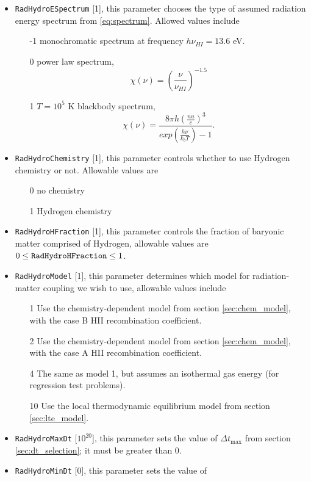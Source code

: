 \documentclass[letterpaper,10pt]{article}
\renewcommand{\(}{\left(}
\renewcommand{\)}{\right)}
\newcommand{\dt}{\Delta t}
\begin{document}
\begin{itemize}
\item {\tt RadHydroESpectrum} [1], this parameter chooses the type of
  assumed radiation energy spectrum from \eqref{eq:spectrum}.  Allowed
  values include
  \begin{itemize}
  \item[-1] monochromatic spectrum at frequency $h\nu_{HI} = 13.6$ eV.
  \item[0] power law spectrum,
    \[
      \chi(\nu) = \left(\frac{\nu}{\nu_{HI}}\right)^{-1.5}
    \]
  \item[1] $T=10^5$ K blackbody spectrum, 
    \[
       \chi(\nu) = \frac{8 \pi h
         \left(\frac{nu}{c}\right)^3}{exp\left(\frac{h\nu}{k_b T}\right)-1}.
    \]
  \end{itemize}
\item {\tt RadHydroChemistry} [1], this parameter controls whether to
  use Hydrogen chemistry or not.  Allowable values are
  \begin{itemize}
  \item[0] no chemistry
  \item[1] Hydrogen chemistry
  \end{itemize}
\item {\tt RadHydroHFraction} [1], this parameter controls the
  fraction of baryonic matter comprised of Hydrogen, allowable
  values are $0 \le {\tt RadHydroHFraction} \le 1$.
\item {\tt RadHydroModel} [1], this parameter determines which model
  for radiation-matter coupling we wish to use, allowable values
  include
  \begin{itemize}
  \item[1] Use the chemistry-dependent model from section
    \ref{sec:chem_model}, with the case B HII recombination coefficient.
  \item[2] Use the chemistry-dependent model from section
    \ref{sec:chem_model}, with the case A HII recombination coefficient.
  \item[4] The same as model 1, but assumes an isothermal gas energy
    (for regression test problems).
  \item[10] Use the local thermodynamic equilibrium model from section
    \ref{sec:lte_model}.
  \end{itemize}
\item {\tt RadHydroMaxDt} [$10^{20}$], this parameter sets the value of
  $\dt_{\text{max}}$ from section \ref{sec:dt_selection}; it must be
  greater than 0.
\item {\tt RadHydroMinDt} [0], this parameter sets the value of

\end{itemize}
\end{document}
